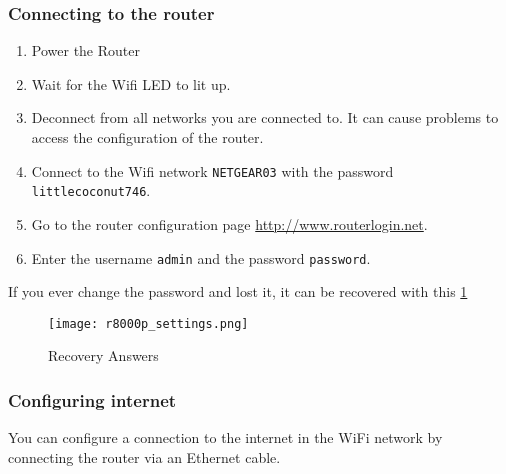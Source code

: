\subsubsection{Connecting to the router}
\begin{enumerate}
    \item Power the Router
    \item Wait for the Wifi LED to lit up.
    \item Deconnect from all networks you are connected to. It can cause problems to access the configuration of the router.
    \item Connect to the Wifi network \texttt{NETGEAR03} with the password \texttt{littlecoconut746}.
    \item Go to the router configuration page \url{http://www.routerlogin.net}.
    \item Enter the username \texttt{admin} and the password \texttt{password}.
\end{enumerate}

If you ever change the password and lost it, it can be recovered with this \ref{fig:r8000p_settings}

\begin{figure}[!ht]
    \centering
    \texttt{[image: r8000p\_settings.png]}
    \caption{Recovery Answers}
    \label{fig:r8000p_settings}
\end{figure}



\subsubsection{Configuring internet}
You can configure a connection to the internet in the WiFi network by connecting the router via an Ethernet cable.

